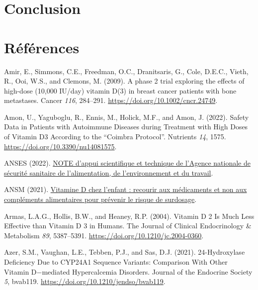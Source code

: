 \documentclass[
  a4paper,
  DIV=11,
  numbers=noendperiod,
  listof=totoc]{scrreprt}
\newlength{\cslhangindent}
\newlength{\cslentryspacingunit} %
\newenvironment{CSLReferences}[2] %
 {%
  \setlength{\parindent}{0pt}
  \ifodd #1
  \let\oldpar\par
  \def\par{\hangindent=\cslhangindent\oldpar}
  \fi
  \setlength{\parskip}{#2\cslentryspacingunit}
 }%
 {}
\begin{document}
\hypertarget{conclusion}{%
\chapter{Conclusion}\label{conclusion}}

\newpage{}

\hypertarget{ruxe9fuxe9rences}{%
\chapter*{Références}\label{ruxe9fuxe9rences}}

\hypertarget{refs}{}
\begin{CSLReferences}{0}{0}
\leavevmode{}%
Amir, E., Simmons, C.E., Freedman, O.C., Dranitsaris, G., Cole, D.E.C.,
Vieth, R., Ooi, W.S., and Clemons, M. (2009). {A phase 2 trial exploring
the effects of high-dose (10,000 IU/day) vitamin D(3) in breast cancer
patients with bone metastases.} Cancer \emph{116}, 284--291.
\url{https://doi.org/10.1002/cncr.24749}.

\leavevmode{}%
Amon, U., Yaguboglu, R., Ennis, M., Holick, M.F., and Amon, J. (2022).
{Safety Data in Patients with Autoimmune Diseases during Treatment with
High Doses of Vitamin D3 According to the {``Coimbra Protocol''}}.
Nutrients \emph{14}, 1575. \url{https://doi.org/10.3390/nu14081575}.

\leavevmode{}%
ANSES (2022).
\href{https://www.anses.fr/fr/system/files/NUT2022AST0099.pdf}{{NOTE
d'appui scientifique et technique de l'Agence nationale de sécurité
sanitaire de l'alimentation, de l'environnement et du travail}}.

\leavevmode{}%
ANSM (2021).
\href{https://ansm.sante.fr/actualites/vitamine-d-chez-lenfant-recourir-aux-medicaments-et-non-aux-complements-alimentaires-pour-prevenir-le-risque-de-surdosage}{{Vitamine
D chez l'enfant : recourir aux médicaments et non aux compléments
alimentaires pour prévenir le risque de surdosage}}.

\leavevmode{}%
Armas, L.A.G., Hollis, B.W., and Heaney, R.P. (2004). {Vitamin D 2 Is
Much Less Effective than Vitamin D 3 in Humans}. The Journal of Clinical
Endocrinology \& Metabolism \emph{89}, 5387--5391.
\url{https://doi.org/10.1210/jc.2004-0360}.

\leavevmode{}%
Azer, S.M., Vaughan, L.E., Tebben, P.J., and Sas, D.J. (2021).
{24-Hydroxylase Deficiency Due to CYP24A1 Sequence Variants: Comparison
With Other Vitamin D−mediated Hypercalcemia Disorders}. Journal of the
Endocrine Society \emph{5}, bvab119.
\url{https://doi.org/10.1210/jendso/bvab119}.


\end{CSLReferences}
\end{document}
